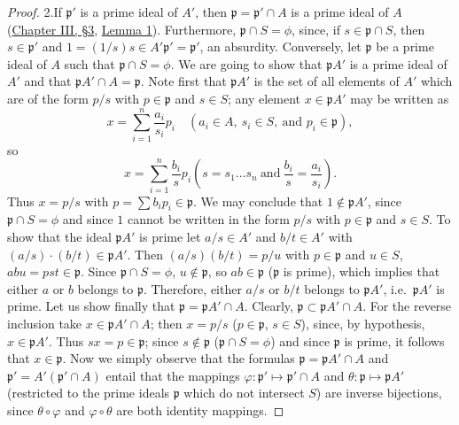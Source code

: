 \begin{proof}
2.\quad If $\mathfrak{p}'$ is a prime ideal of $A'$, then
$\mathfrak{p}=\mathfrak{p}'\cap A$ is a prime ideal of $A$ (\hyperref[sec:3.3]{Chapter III, §3},
\hyperref[lem:III.3.1]{Lemma 1}). Furthermore, $\mathfrak{p}\cap S=\phi$, since, if
$s\in\mathfrak{p}\cap S$, then $s\in\mathfrak{p}'$ and
$1=(1/s)s\in A'\mathfrak{p}'=\mathfrak{p}'$, an absurdity. Conversely, let
$\mathfrak{p}$ be a prime ideal of $A$ such that $\mathfrak{p}\cap S=\phi$.
We are going to show that $\mathfrak{p}A'$ is a prime ideal of $A'$ and that
$\mathfrak{p}A'\cap A=\mathfrak{p}$. Note first that $\mathfrak{p}A'$ is the
set of all elements of $A'$ which are of the form $p/s$ with
$p\in\mathfrak{p}$ and $s\in S$; any element $x\in\mathfrak{p}A'$ may be
written as
\[
x=\sum_{i=1}^{n}\frac{a_{i}}{s_{i}}p_{i}
\quad(a_{i}\in A,\ s_{i}\in S,\ \text{and } p_{i}\in\mathfrak{p}),
\]
so
\[
x=\sum_{i=1}^{n}\frac{b_{i}}{s}p_{i}
\left(s=s_{1}\ldots s_{n}\ \text{and}\ \frac{b_{i}}{s}=\frac{a_{i}}{s_{i}}\right).
\]
Thus $x=p/s$ with $p=\sum b_{i}p_{i}\in\mathfrak{p}$. We may conclude that
$1\notin\mathfrak{p}A'$, since $\mathfrak{p}\cap S=\phi$ and since $1$ cannot
be written in the form $p/s$ with $p\in\mathfrak{p}$ and $s\in S$. To show
that the ideal $\mathfrak{p}A'$ is prime let $a/s\in A'$ and $b/t\in A'$
with $(a/s)\cdot(b/t)\in\mathfrak{p}A'$. Then $(a/s)(b/t)=p/u$ with
$p\in\mathfrak{p}$ and $u\in S$, $abu=pst\in\mathfrak{p}$. Since
$\mathfrak{p}\cap S=\phi$, $u\notin\mathfrak{p}$, so
$ab\in\mathfrak{p}$ ($\mathfrak{p}$ is prime), which implies that either $a$
or $b$ belongs to $\mathfrak{p}$. Therefore, either $a/s$ or $b/t$ belongs to
$\mathfrak{p}A'$, i.e.\ $\mathfrak{p}A'$ is prime. Let us show finally that
$\mathfrak{p}=\mathfrak{p}A'\cap A$. Clearly,
$\mathfrak{p}\subset\mathfrak{p}A'\cap A$. For the reverse inclusion take
$x\in\mathfrak{p}A'\cap A$; then $x=p/s$ ($p\in\mathfrak{p}$, $s\in S$),
since, by hypothesis, $x\in\mathfrak{p}A'$. Thus $sx=p\in\mathfrak{p}$; since
$s\notin\mathfrak{p}$ ($\mathfrak{p}\cap S=\phi$) and since
$\mathfrak{p}$ is prime, it follows that $x\in\mathfrak{p}$. Now we simply
observe that the formulas $\mathfrak{p}=\mathfrak{p}A'\cap A$ and
$\mathfrak{p}'=A'(\mathfrak{p}'\cap A)$ entail that the mappings
$\varphi:\mathfrak{p}'\mapsto\mathfrak{p}'\cap A$ and
$\theta:\mathfrak{p}\mapsto\mathfrak{p}A'$ (restricted to the prime ideals
$\mathfrak{p}$ which do not intersect $S$) are inverse bijections, since
$\theta\circ\varphi$ and $\varphi\circ\theta$ are both identity mappings.
\end{proof}

